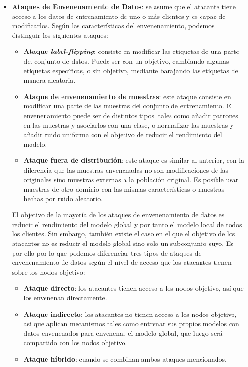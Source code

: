 \begin{itemize}
    \item \textbf{Ataques de Envenenamiento de Datos}: se asume que el atacante tiene acceso a los datos de entrenamiento de uno o más clientes y es capaz de modificarlos. Según las características del envenenamiento, podemos distinguir los siguientes ataques:
    \begin{itemize}
        \item \textbf{Ataque \textit{label-flipping}}: consiste en modificar las etiquetas de una parte del conjunto de datos. Puede ser con un objetivo, cambiando algunas etiquetas específicas, o sin objetivo, mediante barajando las etiquetas de manera aleatoria.
        \item \textbf{Ataque de envenenamiento de muestras}: este ataque consiste en modificar una parte de las muestras del conjunto de entrenamiento. El envenenamiento puede ser de distintos tipos, tales como añadir patrones en las muestras y asociarlos con una clase, o normalizar las muestras y añadir ruido uniforma con el objetivo de reducir el rendimiento del modelo.
        \item \textbf{Ataque fuera de distribución}: este ataque es similar al anterior, con la diferencia que las muestras envenenadas no son modificaciones de las originales sino muestras externas a la población original. Es posible usar muestras de otro dominio con las mismas características o muestras hechas por ruido aleatorio.
    \end{itemize}

    El objetivo de la mayoría de los ataques de envenenamiento de datos es reducir el rendimiento del modelo global y por tanto el modelo local de todos los clientes. Sin embargo, también existe el caso en el que el objetivo de los atacantes no es reducir el modelo global sino solo un subconjunto suyo. Es por ello por lo que podemos diferenciar tres tipos de ataques de envenenamiento de datos según el nivel de acceso que los atacantes tienen sobre los nodos objetivo:
    \begin{itemize}
        \item \textbf{Ataque directo}: los atacantes tienen acceso a los nodos objetivo, así que los envenenan directamente.
        \item \textbf{Ataque indirecto}: los atacantes no tienen acceso a los nodos objetivo, así que aplican mecanismos tales como entrenar sus propios modelos con datos envenenados para envenenar el modelo global, que luego será compartido con los nodos objetivo.
        \item \textbf{Ataque híbrido}: cuando se combinan ambos ataques mencionados.
    \end{itemize}


\end{itemize}
